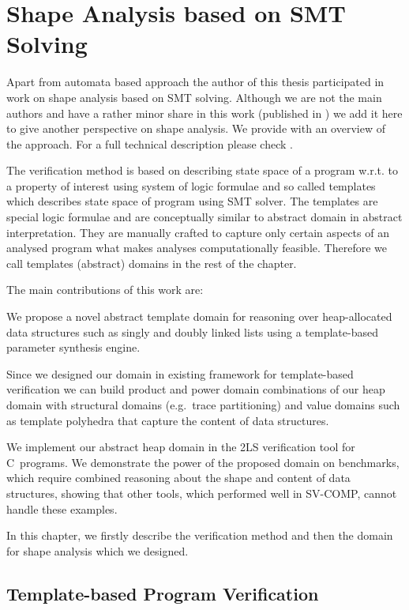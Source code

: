 {\chapter{Shape Analysis based on SMT Solving}
\label{ch:fmcad}
Apart from automata based approach the author of this thesis participated in work on shape analysis
based on SMT solving.
Although we are not the main authors and have a rather minor share in this work (published in \cite{fmcad18})
we add it here to give another perspective on shape analysis.
We provide with an overview of the approach. For a full technical description please check \cite{fmcad18}.

The verification method is based on describing state space of a program w.r.t. to a property of interest
using system of logic formulae and so called templates which describes state space of program using SMT solver.
The templates are special logic formulae and are conceptually similar to abstract domain
in abstract interpretation.
They are manually crafted to capture only certain aspects of an analysed program
what makes analyses computationally feasible.
Therefore we call templates (abstract) domains in the rest of the chapter.

The main contributions of this work are:
\begin{compactenum}
\item We propose a novel abstract template domain for reasoning over
  heap-allocated data structures such as singly and doubly linked
  lists using a template-based parameter synthesis engine.
\item Since we designed our domain in existing framework for template-based
  verification we can build product and power domain combinations
  of our heap domain with structural domains (e.g.\ trace partitioning) and
  value domains such as template polyhedra that capture the content of
  data structures.
\item We implement our abstract heap domain in the 2LS verification
  tool for C~programs. We demonstrate the power of the proposed domain
  on benchmarks, which require combined reasoning about
  the shape and content of data structures, showing that other tools, which
  performed well in SV-COMP, cannot handle these examples.
\end{compactenum}

In this chapter, we firstly describe the verification method and then the domain for shape
analysis which we designed.

\section{Template-based Program Verification}

}
